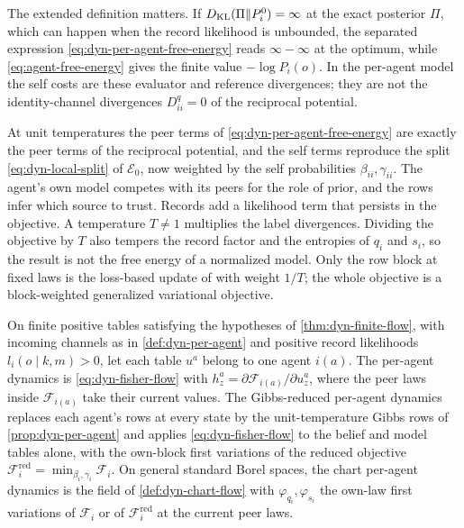 The extended definition matters. If $D_{\mathrm{KL}}(\Pi\Vert P_i^0)=\infty$ at the exact posterior $\Pi$, which can happen when the record likelihood is unbounded, the separated expression \cref{eq:dyn-per-agent-free-energy} reads $\infty-\infty$ at the optimum, while \cref{eq:agent-free-energy} gives the finite value $-\log P_i(o)$. In the per-agent model the self costs are these evaluator and reference divergences; they are not the identity-channel divergences $D^q_{ii}=0$ of the reciprocal potential.

At unit temperatures the peer terms of \cref{eq:dyn-per-agent-free-energy} are exactly the peer terms of the reciprocal potential, and the self terms reproduce the split \cref{eq:dyn-local-split} of $\mathcal E_0$, now weighted by the self probabilities $\beta_{ii},\gamma_{ii}$. The agent's own model competes with its peers for the role of prior, and the rows infer which source to trust. Records add a likelihood term that persists in the objective. A temperature $T\neq1$ multiplies the label divergences. Dividing the objective by $T$ also tempers the record factor and the entropies of $q_i$ and $s_i$, so the result is not the free energy of a normalized model. Only the row block at fixed laws is the loss-based update of \citet{BissiriHolmesWalker2016} with weight $1/T$; the whole objective is a block-weighted generalized variational objective.

On finite positive tables satisfying the hypotheses of \cref{thm:dyn-finite-flow}, with incoming channels as in \cref{def:dyn-per-agent} and positive record likelihoods $l_i(o\mid k,m)>0$, let each table $u^a$ belong to one agent $i(a)$. The per-agent dynamics is \cref{eq:dyn-fisher-flow} with $h^a_z=\partial\mathcal F_{i(a)}/\partial u^a_z$, where the peer laws inside $\mathcal F_{i(a)}$ take their current values. The Gibbs-reduced per-agent dynamics replaces each agent's rows at every state by the unit-temperature Gibbs rows of \cref{prop:dyn-per-agent} and applies \cref{eq:dyn-fisher-flow} to the belief and model tables alone, with the own-block first variations of the reduced objective $\mathcal F_i^{\mathrm{red}}=\min_{\beta_i,\gamma_i}\mathcal F_i$. On general standard Borel spaces, the chart per-agent dynamics is the field of \cref{def:dyn-chart-flow} with $\varphi_{q_i},\varphi_{s_i}$ the own-law first variations of $\mathcal F_i$ or of $\mathcal F_i^{\mathrm{red}}$ at the current peer laws.

